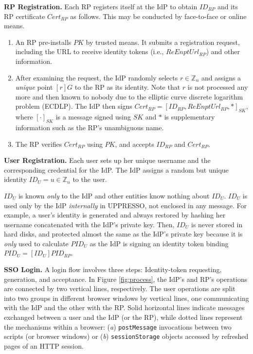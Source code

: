 \noindent\textbf{RP Registration.}
Each RP registers itself at the IdP to obtain $ID_{RP}$ and its RP certificate $Cert_{RP}$ as follows.
This may be conducted by face-to-face or online \cite{OpenID-dy-regi} means.
\begin{enumerate}
\setlength{\topsep}{0pt}
\setlength{\partopsep}{0pt}
\setlength{\itemsep}{0pt}
\setlength{\parsep}{0pt}
\setlength{\parskip}{0pt}
\item[1.]
An RP pre-installs $PK$ by trusted means.
It submits a registration request, including the URL to receive identity tokens (i.e., $ReEnptUrl_{RP}$) and other information.
\item[2.]
After examining the request,
the IdP randomly selects $r \in \mathbb{Z}_n$
        and assigns a \emph{unique} point $[r]G$ to the RP as its identity.
Note that $r$ is not processed any more and then known to nobody
 due to the elliptic curve discrete logarithm problem (ECDLP).
The IdP then signs $Cert_{RP} = [ID_{RP}, ReEnptUrl_{RP}, *]_{SK}$,
     where $[\cdot]_{SK}$ is a message signed using $SK$ and $*$ is supplementary information such as the RP's unambiguous name.
\item[3.]
The RP verifies $Cert_{RP}$ using $PK$, and accepts $ID_{RP}$ and $Cert_{RP}$.
\end{enumerate}


\noindent\textbf{User Registration.}
Each user sets up her unique username and the corresponding credential for the IdP.
The IdP assigns
a random but unique identity $ID_U = u\in \mathbb{Z}_n$ to the user.

$ID_U$ is known \emph{only} to the IdP
    and other entities know nothing about $ID_U$.
$ID_U$ is used only by the IdP \emph{internally} in UPPRESSO,
 not enclosed in any message.
For example, a user's identity is generated and always restored by hashing her username concatenated with the IdP's private key.
Then,
 $ID_U$ is never stored in hard disks,
 and protected almost the same as the IdP's private key
because it is \emph{only} used to calculate $PID_{U}$ as the IdP is signing an identity token binding $PID_{U}=
  [{ID_U}]{PID_{RP}}$.


\noindent\textbf{SSO Login.} 
A login flow %
involves three steps: Identity-token requesting, generation, and acceptance.
In Figure \ref{fig:process}, the IdP's and RP's operations are connected by two vertical lines, respectively. The user operations are split into two groups in different browser windows by vertical lines, one communicating with the IdP and the other with the RP. Solid horizontal lines indicate messages exchanged between a user and the IdP (or the RP), while dotted lines represent the mechanisms within a browser:
(\emph{a}) \verb+postMessage+ invocations between two scripts (or browser windows)
or (\emph{b}) \verb+sessionStorage+ objects accessed by refreshed pages of an HTTP session.



